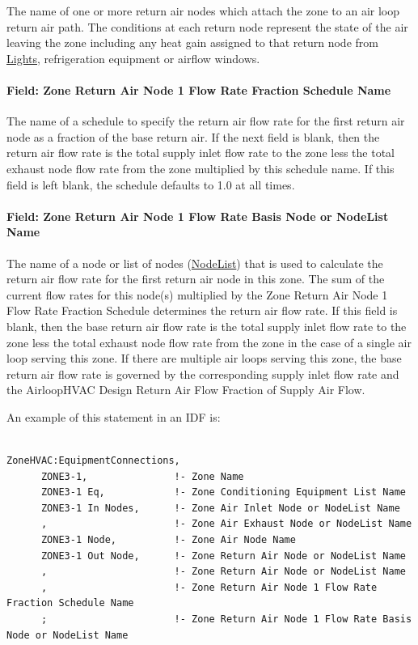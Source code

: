 The name of one or more return air nodes which attach the zone to an air loop return air path. The conditions at each return node represent the state of the air leaving the zone including any heat gain assigned to that return node from \hyperref[lights-000]{Lights}, refrigeration equipment or airflow windows.

\paragraph{Field: Zone Return Air Node 1 Flow Rate Fraction Schedule Name}\label{field-zone-return-air-flow-rate-fraction-schedule-name}

The name of a schedule to specify the return air flow rate for the first return air node as a fraction of the base return air. If the next field is blank, then the return air flow rate is the total supply inlet flow rate to the zone less the total exhaust node flow rate from the zone multiplied by this schedule name. If this field is left blank, the schedule defaults to 1.0 at all times.

\paragraph{Field: Zone Return Air Node 1 Flow Rate Basis Node or NodeList Name}\label{field-zone-return-air-flow-rate-basis-node-or-nodelist-name}

The name of a node or list of nodes (\hyperref[nodelist]{NodeList}) that is used to calculate the return air flow rate for the first return air node in this zone. The sum of the current flow rates for this node(s) multiplied by the Zone Return Air Node 1 Flow Rate Fraction Schedule determines the return air flow rate. If this field is blank, then the base return air flow rate is the total supply inlet flow rate to the zone less the total exhaust node flow rate from the zone in the case of a single air loop serving this zone. If there are multiple air loops serving this zone, the base return air flow rate is governed by the corresponding supply inlet flow rate and the AirloopHVAC Design Return Air Flow Fraction of Supply Air Flow.

An example of this statement in an IDF is:

\begin{lstlisting}

ZoneHVAC:EquipmentConnections,
      ZONE3-1,               !- Zone Name
      ZONE3-1 Eq,            !- Zone Conditioning Equipment List Name
      ZONE3-1 In Nodes,      !- Zone Air Inlet Node or NodeList Name
      ,                      !- Zone Air Exhaust Node or NodeList Name
      ZONE3-1 Node,          !- Zone Air Node Name
      ZONE3-1 Out Node,      !- Zone Return Air Node or NodeList Name
      ,                      !- Zone Return Air Node or NodeList Name
      ,                      !- Zone Return Air Node 1 Flow Rate Fraction Schedule Name
      ;                      !- Zone Return Air Node 1 Flow Rate Basis Node or NodeList Name
\end{lstlisting}


